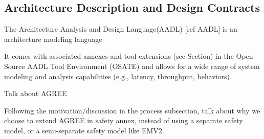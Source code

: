 \subsection{Architecture Description and Design Contracts}
\label{subsec:aadl-agree}

The Architecture Analysis and Design Language(AADL) [ref AADL] is an architecture modeling language %

It comes with associated annexes and tool extensions (see Section) in the Open Source AADL Tool Environment (OSATE) and allows for a wide range of system modeling and analysis capabilities (e.g., latency, throughput, behaviors). 

Talk about AGREE

Following the motivation/discussion in the process subsection, talk about why we choose to extend AGREE in safety annex, instead of using a separate safety model, or a semi-separate safety model like EMV2.
